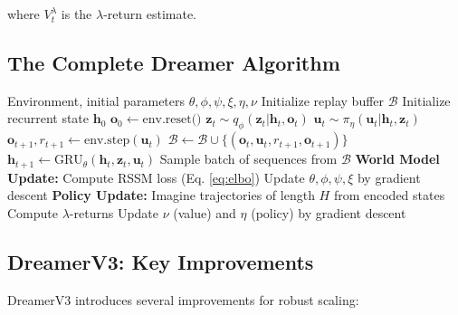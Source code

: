 where $V_t^\lambda$ is the $\lambda$-return estimate.

\subsection{The Complete Dreamer Algorithm}

\begin{algorithm}[H]
\caption{Dreamer: Model-Based Reinforcement Learning}
\begin{algorithmic}[1]
\Require Environment, initial parameters $\theta, \phi, \psi, \xi, \eta, \nu$
\State Initialize replay buffer $\mathcal{B}$
\State Initialize recurrent state $\mathbf{h}_0$
    \State $\mathbf{o}_0 \gets \text{env.reset()}$
        \State $\mathbf{z}_t \sim q_\phi(\mathbf{z}_t | \mathbf{h}_t, \mathbf{o}_t)$ 
        \State $\mathbf{u}_t \sim \pi_\eta(\mathbf{u}_t | \mathbf{h}_t, \mathbf{z}_t)$ 
        \State $\mathbf{o}_{t+1}, r_{t+1} \gets \text{env.step}(\mathbf{u}_t)$ 
        \State $\mathcal{B} \gets \mathcal{B} \cup \{(\mathbf{o}_t, \mathbf{u}_t, r_{t+1}, \mathbf{o}_{t+1})\}$ 
        \State $\mathbf{h}_{t+1} \gets \text{GRU}_\theta(\mathbf{h}_t, \mathbf{z}_t, \mathbf{u}_t)$ 
            \State Sample batch of sequences from $\mathcal{B}$
            \State \textbf{World Model Update:}
            \State \quad Compute RSSM loss (Eq. \ref{eq:elbo})
            \State \quad Update $\theta, \phi, \psi, \xi$ by gradient descent
            \State \textbf{Policy Update:}
            \State \quad Imagine trajectories of length $H$ from encoded states
            \State \quad Compute $\lambda$-returns
            \State \quad Update $\nu$ (value) and $\eta$ (policy) by gradient descent
        \EndIf
    \EndFor
\EndFor
\end{algorithmic}
\end{algorithm}

\subsection{DreamerV3: Key Improvements}

DreamerV3 introduces several improvements for robust scaling:

